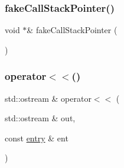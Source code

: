 \mbox{\label{namespacestacktrace_a30a6d3fa1d0572c74ba3ea308866bba8}} 
\subsubsection{\texorpdfstring{fake\+Call\+Stack\+Pointer()}{fakeCallStackPointer()}}
{\footnotesize\ttfamily void $\ast$\& fake\+Call\+Stack\+Pointer (\begin{DoxyParamCaption}{ }\end{DoxyParamCaption})}

\mbox{\label{namespacestacktrace_a9cdc7f5a1e1c1f53958a3804334ae6c7}} 
\subsubsection{\texorpdfstring{operator$<$$<$()}{operator<<()}}
{\footnotesize\ttfamily std\+::ostream \& operator$<$$<$ (\begin{DoxyParamCaption}\item[{std\+::ostream \&}]{out,  }\item[{const \mbox{\hyperlink{structstacktrace_1_1entry}{entry}} \&}]{ent }\end{DoxyParamCaption})}


